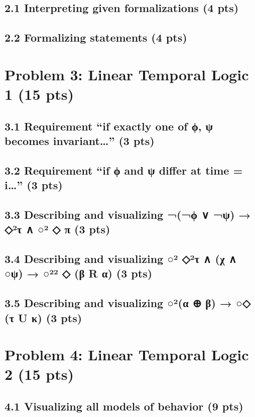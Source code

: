 \documentclass[11pt]{article}
\begin{document}
\subsection*{2.1 Interpreting given formalizations (4 pts)}

\subsection*{2.2 Formalizing statements (4 pts)}

\newpage
\section{Problem 3: Linear Temporal Logic 1 (15 pts)}

\subsection*{3.1 Requirement “if exactly one of ϕ, ψ becomes invariant…” (3 pts)}

\subsection*{3.2 Requirement “if ϕ and ψ differ at time = i…” (3 pts)}

\subsection*{3.3 Describing and visualizing ¬(¬ϕ ∨ ¬ψ) → ◇²τ ∧ ○² ◇ π (3 pts)}

\subsection*{3.4 Describing and visualizing ○² ◇²τ ∧ (χ ∧ ○ψ) → ○²² ◇ (β R α) (3 pts)}

\subsection*{3.5 Describing and visualizing ○²(α ⊕ β) → ○◇ (τ U κ) (3 pts)}

\newpage
\section{Problem 4: Linear Temporal Logic 2 (15 pts)}

\subsection*{4.1 Visualizing all models of behavior (9 pts)}
\end{document}
